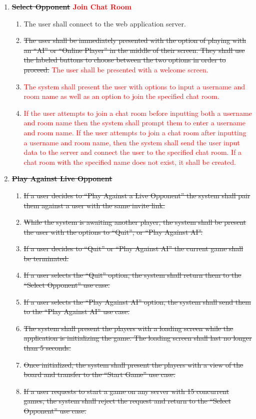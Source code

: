 \documentclass[12pt, titlepage]{article}
\begin{document}
        \begin{enumerate}[{UC}1.]
        	\item \textbf{\sout{Select Opponent} \textcolor{red}{Join Chat Room}}
        	\begin{enumerate}[{FR}1.]
        	    \item The user shall connect to the web application server.
        		\item \sout{The user shall be immediately presented with the option of playing with an ``AI'' or ``Online Player'' in the middle of their screen. They shall use the labeled buttons to choose between the two options in order to proceed.} \textcolor{red}{The user shall be presented with a welcome screen.}
        		\item \textcolor{red}{The system shall present the user with options to input a username and room name as well as an option to join the specified chat room.}
        		\item \textcolor{red}{If the user attempts to join a chat room before inputting both a username and room name then the system shall prompt them to enter a username and room name. If the user attempts to join a chat room after inputting a username and room name, then the system shall send the user input data to the server and connect the user to the specified chat room. If a chat room with the specified name does not exist, it shall be created.}
        	\end{enumerate}
        	
        	\item \textbf{\sout{Play Against Live Opponent}}
        	\begin{enumerate}[{FR}1., resume]
        		\item \sout{If a user decides to ``Play Against a Live Opponent'' the system shall pair them against a user with the same invite link.}
        		\item \sout{While the system is awaiting another player, the system shall be present the user with the options to ``Quit'', or ``Play Against AI''.}
        		\item \sout{If a user decides to ``Quit'' or ``Play Against AI'' the current game shall be terminated.}
        		\item \sout{If a user selects the ``Quit'' option, the system shall return them to the ``Select Opponent'' use case.}
        		\item \sout{If a user selects the ``Play Against AI'' option, the system shall send them to the ``Play Against AI'' use case.}
        		\item \sout{The system shall present the players with a loading screen while the application is initializing the game. The loading screen shall last no longer than 5 seconds.}
        		\item \sout{Once initialized, the system shall present the players with a view of the board and transfer to the ``Start Game'' use case.}
        		\item \sout{If a user requests to start a game on any server with 15 concurrent games, the system shall reject the request and return to the ``Select Opponent'' use case.}
        	\end{enumerate}
        	

\end{enumerate}
\end{document}
